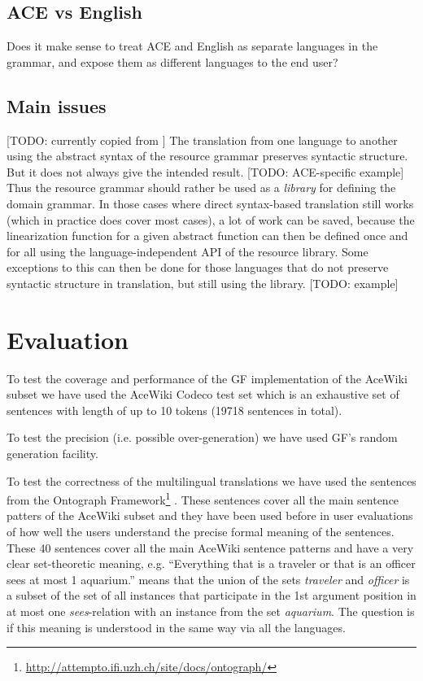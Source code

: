 \documentclass[a4paper]{article}
\begin{document}
\subsection{ACE vs English}

Does it make sense to treat ACE and English as separate languages in the
grammar, and expose them as different languages to the end user?

\subsection{Main issues}

[TODO: currently copied from \cite{ranta:cnl2009_revised}]
The translation from one language to another using the abstract syntax of the
resource grammar preserves syntactic structure. But it does not always give
the intended result. [TODO: ACE-specific example]
Thus the resource grammar should rather be used as a \emph{library} for
defining the domain grammar. In those cases where direct syntax-based
translation still works (which in practice does cover most cases), a lot of
work can be saved, because the linearization function for a given abstract
function can then be defined once and for all using the language-independent
API of the resource library. Some exceptions to this can then be done for
those languages that do not preserve syntactic structure in translation,
but still using the library. [TODO: example]

\section{Evaluation}

To test the coverage and performance of the GF implementation of the
AceWiki subset we have used
the AceWiki Codeco test set which
is an exhaustive set of sentences with length of up to 10 tokens
(19718 sentences in total).

To test the precision (i.e. possible over-generation) we have used GF's
random generation facility.

To test the correctness of the multilingual translations we have used
the sentences from the
Ontograph
Framework\footnote{\url{http://attempto.ifi.uzh.ch/site/docs/ontograph/}}
\cite{kuhn2009cnlmain}. These sentences cover all the main sentence
patters of the AceWiki subset and they have been used before in user
evaluations of how well the users understand the precise formal meaning
of the sentences.
These 40 sentences cover all the main AceWiki sentence patterns and have
a very clear set-theoretic meaning, e.g.
``Everything that is a traveler or that is an officer sees
at most 1 aquarium.'' means that the union of the sets \emph{traveler} and
\emph{officer} is a subset of the set of all instances that participate in
the 1st argument position in at most one \emph{sees}-relation with an
instance from the set \emph{aquarium}.
The question is if this meaning is understood in the same way via all the
languages.
\end{document}
